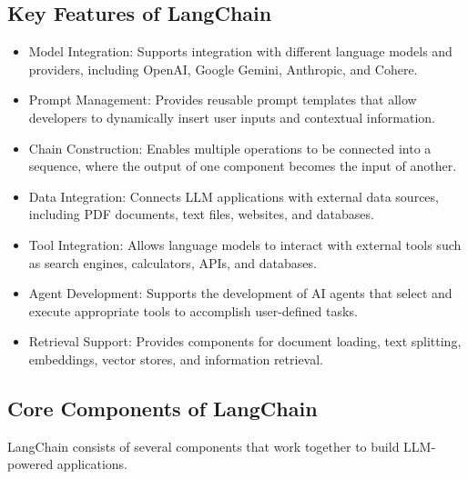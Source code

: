 \subsection{Key Features of LangChain}

\begin{itemize}
    \item Model Integration: Supports integration with different language models and providers, including OpenAI, Google Gemini, Anthropic, and Cohere.
    
    \item Prompt Management: Provides reusable prompt templates that allow developers to dynamically insert user inputs and contextual information.
    
    \item Chain Construction: Enables multiple operations to be connected into a sequence, where the output of one component becomes the input of another.
    
    \item Data Integration: Connects LLM applications with external data sources, including PDF documents, text files, websites, and databases.
    
    \item Tool Integration: Allows language models to interact with external tools such as search engines, calculators, APIs, and databases.
    
    \item Agent Development: Supports the development of AI agents that select and execute appropriate tools to accomplish user-defined tasks.
    
    \item Retrieval Support: Provides components for document loading, text splitting, embeddings, vector stores, and information retrieval.
\end{itemize}

\subsection{Core Components of LangChain}

LangChain consists of several components that work together to build LLM-powered applications.

